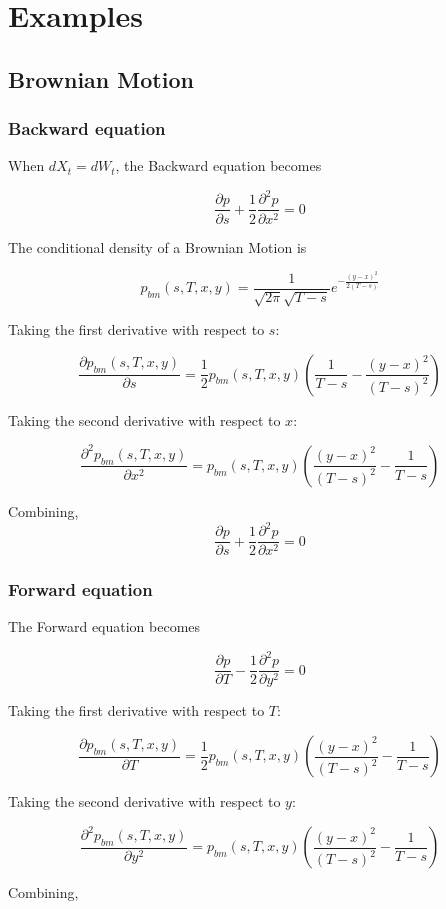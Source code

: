 \documentclass{article}
\theoremstyle{definition}
\begin{document}
\section{Examples}

\subsection{Brownian Motion}
\subsubsection{Backward equation}
When \(dX_t=dW_t\), the Backward equation becomes

\[\frac{\partial p} {\partial s} + \frac{1}{2} \frac{\partial^2 p}{\partial x^2} =0\]

The conditional density of a Brownian Motion is

\[p_{bm}(s, T, x, y)=\frac{1}{\sqrt{2\pi} \sqrt{T-s}} e^{-\frac{(y-x)^2}{2(T-s)}} \]

Taking the first derivative with respect to \(s\):

\[\frac{\partial p_{bm}(s, T, x, y)}{\partial s}=  \frac{1}{2}p_{bm}(s, T, x, y)\left(\frac{1}{T-s}-\frac{(y-x)^2}{(T-s)^2}\right)  \]

Taking the second derivative with respect to \(x\):

\[\frac{\partial^2 p_{bm}(s, T, x, y)}{\partial x^2}=  p_{bm}(s, T, x, y)\left(\frac{(y-x)^2}{(T-s)^2}-\frac{1}{T-s}\right)  \]

Combining,
\[\frac{\partial p} {\partial s} + \frac{1}{2} \frac{\partial^2 p}{\partial x^2} =0\]
\subsubsection{Forward equation}
The Forward equation becomes

\[\frac{\partial p} {\partial T} -\frac{1}{2} \frac{\partial^2 p}{\partial y^2} =0\]

Taking the first derivative with respect to \(T\):

\[\frac{\partial p_{bm}(s, T, x, y)}{\partial T}=  \frac{1}{2}p_{bm}(s, T, x, y)\left(\frac{(y-x)^2}{(T-s)^2}-\frac{1}{T-s}\right)  \]

Taking the second derivative with respect to \(y\):

\[\frac{\partial^2 p_{bm}(s, T, x, y)}{\partial y^2}=  p_{bm}(s, T, x, y)\left(\frac{(y-x)^2}{(T-s)^2}-\frac{1}{T-s}\right)  \]

Combining, 
\end{document}
